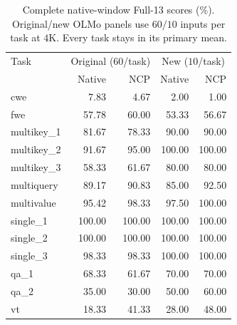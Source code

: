 \begin{table}[ht]
\centering\small
\caption{Complete native-window Full-13 scores (\%). Original/new OLMo panels use $60/10$ inputs per task at $4$K. Every task stays in its primary mean.}
\label{tab:ncp-tasks-new}
\begin{tabular}{@{}lrrrr@{}}
\toprule
Task & \multicolumn{2}{c}{Original ($60$/task)} & \multicolumn{2}{c}{New ($10$/task)} \\
 & Native & NCP & Native & NCP \\
\midrule
cwe & 7.83 & 4.67 & 2.00 & 1.00 \\
fwe & 57.78 & 60.00 & 53.33 & 56.67 \\
multikey\_1 & 81.67 & 78.33 & 90.00 & 90.00 \\
multikey\_2 & 91.67 & 95.00 & 100.00 & 100.00 \\
multikey\_3 & 58.33 & 61.67 & 80.00 & 80.00 \\
multiquery & 89.17 & 90.83 & 85.00 & 92.50 \\
multivalue & 95.42 & 98.33 & 97.50 & 100.00 \\
single\_1 & 100.00 & 100.00 & 100.00 & 100.00 \\
single\_2 & 100.00 & 100.00 & 100.00 & 100.00 \\
single\_3 & 98.33 & 98.33 & 100.00 & 100.00 \\
qa\_1 & 68.33 & 61.67 & 70.00 & 70.00 \\
qa\_2 & 35.00 & 30.00 & 50.00 & 60.00 \\
vt & 18.33 & 41.33 & 28.00 & 48.00 \\
\bottomrule
\end{tabular}
\end{table}
